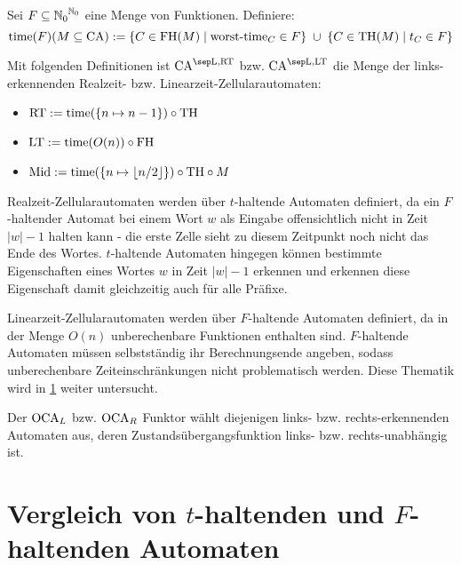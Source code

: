 \begin{definition}
    \label{def:ZeitFunktoren}
    Sei $F \subseteq {\mathbb{N}_0}^{\mathbb{N}_0}$ eine Menge von Funktionen. Definiere:
    \[
        \mathrm{time}(F)(M \subseteq \textrm{CA}) := \{ { C \in \textrm{FH}(M) } \; | \; { \operatorname{worst-time}_C \in F } \} \; \cup \; \{ { C \in \textrm{TH}(M) } \; | \; { t_C \in F } \}
    \]
    
    Mit folgenden Definitionen ist $\CAM{\CALeft, \CART}$ \acs{bzw.} $\CAM{\CALeft, \CALT}$ die Menge der links-erkennenden Realzeit- \acs{bzw.} Linearzeit-Zellularautomaten:

    \begin{itemize}
        \item $\mathrm{\textrm{RT}} := \mathrm{time}(\{ {n \mapsto n - 1} \}) \circ \textrm{TH}$
        \item $\mathrm{\textrm{LT}} := \mathrm{time}(O(n)) \circ \textrm{FH}$
        \item $\mathrm{Mid} := \mathrm{time}(\{ {n \mapsto \lfloor n/2 \rfloor} \}) \circ \textrm{TH} \circ M $
    \end{itemize}   
\end{definition}

Realzeit-Zellularautomaten werden über $t$-haltende Automaten definiert, da ein
$F$-haltender Automat bei einem Wort $w$ als Eingabe offensichtlich nicht in Zeit $|w|-1$ halten kann -
die erste Zelle sieht zu diesem Zeitpunkt noch nicht das Ende des Wortes.
$t$-haltende Automaten hingegen können bestimmte Eigenschaften eines Wortes $w$ in Zeit $|w|-1$ erkennen
und erkennen diese Eigenschaft damit gleichzeitig auch für alle Präfixe.

Linearzeit-Zellularautomaten werden über $F$-haltende Automaten definiert,
da in der Menge $O(n)$ unberechenbare Funktionen enthalten sind.
$F$-haltende Automaten müssen selbstständig ihr Berechnungsende angeben, sodass
unberechenbare Zeiteinschränkungen nicht problematisch werden.
Diese Thematik wird in \cref{sec:Vergleich_t_haltend_F_haltend} weiter untersucht.

\begin{definition}
    Der $\operatorname{OCA}_L$ \acs{bzw.} $\operatorname{OCA}_R$ Funktor wählt diejenigen links- \acs{bzw.} rechts-erkennenden Automaten aus, deren Zustandsübergangsfunktion links- \acs{bzw.} rechts-unabhängig ist.
\end{definition}

\section{Vergleich von \texorpdfstring{$t$}{t}-haltenden und \texorpdfstring{$F$}{F}-haltenden Automaten}
\label{sec:Vergleich_t_haltend_F_haltend}

